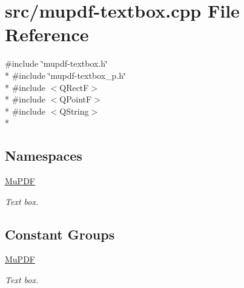 \hypertarget{mupdf-textbox_8cpp}{\section{src/mupdf-\/textbox.cpp File Reference}
\label{mupdf-textbox_8cpp}
}
{\ttfamily \#include \char`\"{}mupdf-\/textbox.\-h\char`\"{}}\\*
{\ttfamily \#include \char`\"{}mupdf-\/textbox\-\_\-p.\-h\char`\"{}}\\*
{\ttfamily \#include $<$Q\-Rect\-F$>$}\\*
{\ttfamily \#include $<$Q\-Point\-F$>$}\\*
{\ttfamily \#include $<$Q\-String$>$}\\*
\subsection*{Namespaces}
\begin{DoxyCompactItemize}
\item 
\hyperlink{namespace_mu_p_d_f}{Mu\-P\-D\-F}
\begin{DoxyCompactList}\small\item\em Text box. \end{DoxyCompactList}\end{DoxyCompactItemize}
\subsection*{Constant Groups}
\begin{DoxyCompactItemize}
\item 
\hyperlink{namespace_mu_p_d_f}{Mu\-P\-D\-F}
\begin{DoxyCompactList}\small\item\em Text box. \end{DoxyCompactList}\end{DoxyCompactItemize}
